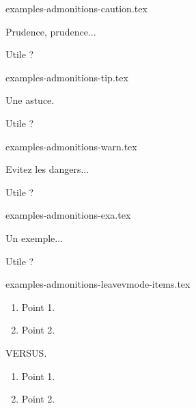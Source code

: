 \begin{filecontents*}[overwrite]{examples-admonitions-caution.tex}
\begin{tdoccaut}
    Prudence, prudence...
\end{tdoccaut}

\begin{tdoccaut}
    Utile ?
\end{tdoccaut}
\end{filecontents*}


\begin{filecontents*}[overwrite]{examples-admonitions-tip.tex}
\begin{tdoctip}
    Une astuce.
\end{tdoctip}

\begin{tdoctip}
    Utile ?
\end{tdoctip}
\end{filecontents*}


\begin{filecontents*}[overwrite]{examples-admonitions-warn.tex}
\begin{tdocwarn}
    Evitez les dangers...
\end{tdocwarn}

\begin{tdocwarn}
    Utile ?
\end{tdocwarn}
\end{filecontents*}


\begin{filecontents*}[overwrite]{examples-admonitions-exa.tex}
\begin{tdocexa}
    Un exemple...
\end{tdocexa}

\begin{tdocexa}
    Utile ?
\end{tdocexa}
\end{filecontents*}


\begin{filecontents*}[overwrite]{examples-admonitions-leavevmode-items.tex}
\begin{tdoctip}
    \begin{enumerate}
        \item Point 1.
        \item Point 2.
    \end{enumerate}
\end{tdoctip}
VERSUS.
\begin{tdoctip}
    \begin{enumerate}[wide]
        \item Point 1.
        \item Point 2.
    \end{enumerate}
\end{tdoctip}
\end{filecontents*}


